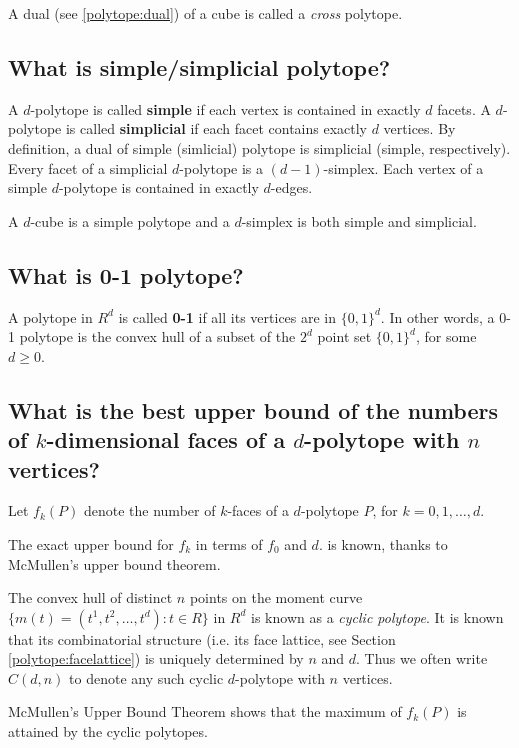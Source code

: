 \documentclass[a4paper,12pt]{article}
\begin{document}
A dual (see \ref{polytope:dual}) of a cube is called
a {\em cross\/} polytope.

\subsection{What is simple/simplicial polytope?} \label{polytope:simpsimp}

A $d$-polytope is called {\bf simple} if each vertex is contained
in exactly $d$ facets.   A $d$-polytope is called {\bf simplicial} 
if each facet contains exactly $d$ vertices.  By definition,
a dual of simple (simlicial)
polytope is simplicial (simple, respectively).
Every facet of a simplicial $d$-polytope is a $(d-1)$-simplex.  Each vertex
of a simple $d$-polytope is contained in exactly $d$-edges.

A $d$-cube is a simple polytope and a $d$-simplex is both simple and
simplicial.

\subsection{What is 0-1 polytope?} \label{polytope:01}

A polytope in $R^d$ is called {\bf 0-1} if all its vertices
are in $\{0, 1\}^d$.  In other words, a 0-1 polytope is 
the convex hull of a subset of the $2^d$ point set $\{0, 1\}^d$,
for some $d\ge 0$.

\subsection{What is the best upper bound of the numbers of 
$k$-dimensional faces of a $d$-polytope with $n$ vertices?} \label{polytope:upperbound}

Let $f_k(P)$ denote the number of $k$-faces of a $d$-polytope $P$,
for $k=0,1,\ldots,d$.

The exact upper bound for $f_k$ in terms of $f_0$ and $d$.
is known, thanks to McMullen's upper bound theorem.

The convex hull of distinct $n$ points on the moment curve
$\{m(t)=(t^1, t^2, \ldots, t^d) : t\in R \}$ in $R^d$
is known as a {\em cyclic polytope}.   It is known that
its combinatorial structure (i.e. its face lattice, see 
Section \ref{polytope:facelattice})
 is uniquely determined by $n$ and $d$.
Thus we often write $C(d, n)$ to denote any such
cyclic $d$-polytope with $n$ vertices.

McMullen's Upper Bound Theorem shows that the maximum
of $f_k(P)$ is attained by the cyclic polytopes.
 
\end{document}
